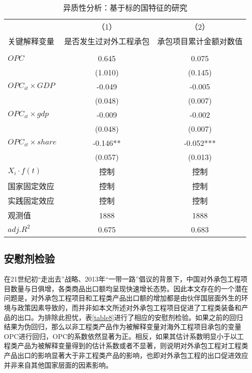\documentclass[a4paper,12pt]{article}
\newcommand{\sym}[1]{#1}
\begin{document}
\begin{table} [ht] \footnotesize
	\newcommand{\tabincell}[2]{\begin{tabular}{@{}#1@{}}#2\end{tabular}}  %
	\centering
	\captionsetup{labelformat=default,labelsep=period}
	\caption{异质性分析：基于标的国特征的研究}\label{table7}
	\begin{tabular}{lcc}
		\toprule
		&（1）&（2）\\
		关键解释变量	&是否发生过对外工程承包&承包项目累计金额对数值 \\	
		\cline{1-3} \\
		\vspace{0.05em}  %
		$OPC$ &0.645 & 0.075 \\
		&(1.010)   	  &(0.145)     \\
		${OPC}_{it}\times GDP$ & -0.049     & -0.005      \\
		&    (0.048)     	  &     (0.007)                 \\	  
		${OPC}_{it}\times gdp$ & -0.009     & -0.002       \\
		&    (0.048)     	  &     (0.007)                 \\	  
		${OPC}_{it}\times share$ & -0.146\sym{**}     & -0.052\sym{***}        \\
		&    (0.057)     	  &     (0.013)                 \\	  
		$X_{i}·f(t)$  & 控制&控制   \\
		国家固定效应  & 控制&控制  \\
		实践固定效应  & 控制&控制   \\
		观测值 &1888&1888\\
		$adj.R^{2}$ &0.675&	0.683\\
		\bottomrule
	\end{tabular}
\end{table}



\subsection{安慰剂检验}

在21世纪初“走出去”战略、2013年“一带一路”倡议的背景下，中国对外承包工程项目数量与日俱增，各类商品出口额均呈现快速增长态势。因此本文存在的一个潜在问题是，对外承包工程项目和工程类产品出口额的增加都是由伙伴国层面外生的环境与政策因素导致的，而并非如本文所述对外承包工程项目促进了工程类装备和产品的出口。为排除此担忧，表\ref{table8}进行了相应的安慰剂检验。如果之前的回归结果为伪回归，那么以非工程类产品作为被解释变量对海外工程项目承包的变量OPC进行回归，OPC的系数依然显著为正。相反，如果其估计系数明显小于以工程类产品为被解释变量得到的估计系数或者不显著，则说明对外承包工程对工程类产品出口的影响显著大于非工程类产品的影响，也即对外承包工程的出口促进效应并非来自其他国家层面的因素影响。
\end{document}
